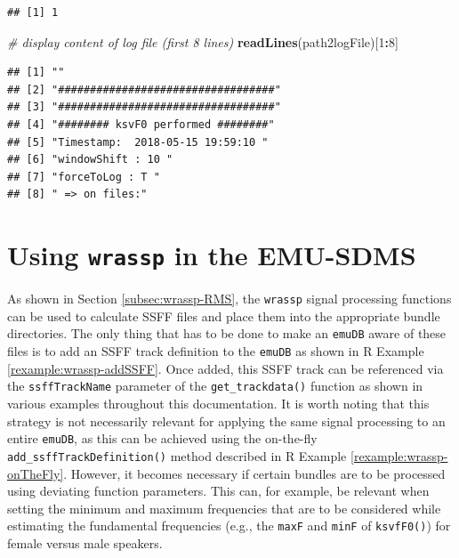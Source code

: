 \documentclass[]{book}
\newenvironment{Shaded}{\begin{snugshade}}{\end{snugshade}}
\newcommand{\CommentTok}[1]{\textcolor[rgb]{0.56,0.35,0.01}{\textit{#1}}}
\newcommand{\DecValTok}[1]{\textcolor[rgb]{0.00,0.00,0.81}{#1}}
\newcommand{\KeywordTok}[1]{\textcolor[rgb]{0.13,0.29,0.53}{\textbf{#1}}}
\newcommand{\NormalTok}[1]{#1}
\newcommand{\OperatorTok}[1]{\textcolor[rgb]{0.81,0.36,0.00}{\textbf{#1}}}
\theoremstyle{definition}
\theoremstyle{definition}
\theoremstyle{definition}
\theoremstyle{remark}
\begin{document}
\begin{verbatim}
## [1] 1
\end{verbatim}

\begin{Shaded}
\begin{Highlighting}[]
\CommentTok{# display content of log file (first 8 lines)}
\KeywordTok{readLines}\NormalTok{(path2logFile)[}\DecValTok{1}\OperatorTok{:}\DecValTok{8}\NormalTok{]}
\end{Highlighting}
\end{Shaded}

\begin{verbatim}
## [1] ""                                  
## [2] "##################################"
## [3] "##################################"
## [4] "######## ksvF0 performed ########" 
## [5] "Timestamp:  2018-05-15 19:59:10 "  
## [6] "windowShift : 10 "                 
## [7] "forceToLog : T "                   
## [8] " => on files:"
\end{verbatim}

\hypertarget{sec:wrassp_emu-sdms}{%
\section{\texorpdfstring{Using \texttt{wrassp} in the
EMU-SDMS}{Using wrassp in the EMU-SDMS}}\label{sec:wrassp_emu-sdms}}

As shown in Section \ref{subsec:wrassp-RMS}, the \texttt{wrassp} signal
processing functions can be used to calculate SSFF files and place them
into the appropriate bundle directories. The only thing that has to be
done to make an \texttt{emuDB} aware of these files is to add an SSFF
track definition to the \texttt{emuDB} as shown in R Example
\ref{rexample:wrassp-addSSFF}. Once added, this SSFF track can be
referenced via the \texttt{ssffTrackName} parameter of the
\texttt{get\_trackdata()} function as shown in various examples
throughout this documentation. It is worth noting that this strategy is
not necessarily relevant for applying the same signal processing to an
entire \texttt{emuDB}, as this can be achieved using the on-the-fly
\texttt{add\_ssffTrackDefinition()} method described in R Example
\ref{rexample:wrassp-onTheFly}. However, it becomes necessary if certain
bundles are to be processed using deviating function parameters. This
can, for example, be relevant when setting the minimum and maximum
frequencies that are to be considered while estimating the fundamental
frequencies (e.g., the \texttt{maxF} and \texttt{minF} of
\texttt{ksvfF0()}) for female versus male speakers.
\end{document}
